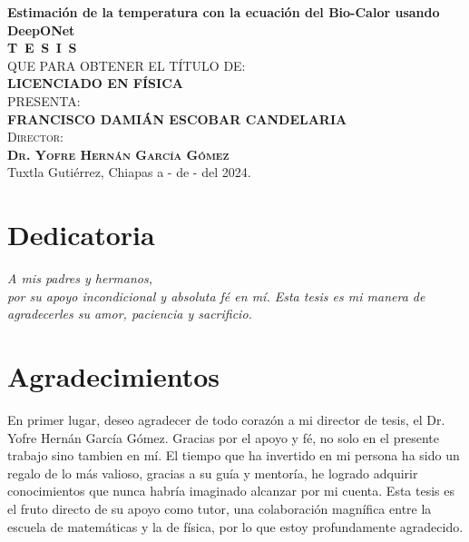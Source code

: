 \documentclass[
  spanish,
  us-letterpaper,
]{scrreprt}
\theoremstyle{plain}
\theoremstyle{definition}
\theoremstyle{remark}
\begin{document}
\begin{titlepage}
\begin{minipage}[t][0.95\textheight][c]{0.76\textwidth}
            \begin{center}
                {\Large\bfseries Estimación de la temperatura con la ecuación del Bio-Calor usando DeepONet}\\[2cm]
                \textsc{\huge \textbf{T\, E\, S\, I\, S}}\\[1.5cm]
                \textsc{\large QUE PARA OBTENER EL TÍTULO DE:}\\[0.3cm]
                \textbf{\textsc{LICENCIADO EN FÍSICA}}\\[1.5cm]
                \textsc{\large PRESENTA:}\\[0.3cm]
                \textbf{\textsc{\large {FRANCISCO DAMIÁN ESCOBAR CANDELARIA}}}\\[2cm]
                {\large\scshape Director:\\[0.3cm]
                {\textbf{\large Dr. Yofre Hernán García Gómez }}}\\[2.0cm]
                \large{Tuxtla Gutiérrez, Chiapas a - de - del 2024.}

            \end{center}
\end{minipage}
\end{titlepage}

\pagebreak[2]

\chapter*{Dedicatoria}
\begin{flushright}
\textit{A mis padres y hermanos, \\ por su apoyo incondicional y absoluta fé en mí. Esta tesis es mi manera de agradecerles su amor, paciencia y sacrificio.}
\end{flushright}


\chapter*{Agradecimientos}
En primer lugar, deseo agradecer de todo corazón a mi director de tesis, el Dr. Yofre Hernán García Gómez. Gracias por el apoyo y fé, no solo en el presente trabajo sino tambien en mí. El tiempo que ha invertido en mi persona ha sido un regalo de lo más valioso, gracias a su guía y mentoría, he logrado adquirir conocimientos que nunca habría imaginado alcanzar por mi cuenta. Esta tesis es el fruto directo de su apoyo como tutor, una colaboración magnífica entre la escuela de matemáticas y la de física, por lo que estoy profundamente agradecido.
\end{document}
